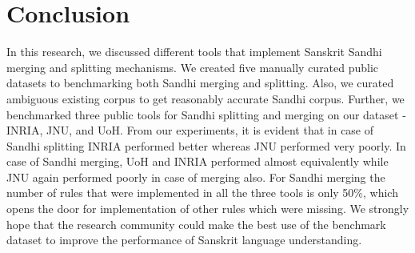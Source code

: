 \documentclass[11pt]{article}
\begin{document}
\section{Conclusion}
In this research, we discussed different tools that implement Sanskrit Sandhi merging and splitting mechanisms. We created five manually curated public datasets to benchmarking both Sandhi merging and splitting. Also, we curated ambiguous existing corpus to get reasonably accurate Sandhi corpus. 
Further, we benchmarked three public tools for Sandhi splitting and merging on our dataset - INRIA, JNU, and UoH. From our experiments, it is evident that in case of Sandhi splitting INRIA performed better whereas JNU performed very poorly. In case of Sandhi merging, UoH and INRIA performed almost equivalently while JNU again performed poorly in case of merging also. 
For Sandhi merging the number of rules that were implemented in all the three tools is only 50\%, which opens the door for implementation of other rules which were missing. We strongly hope that the research community could make the best use of the benchmark dataset to improve the performance of Sanskrit language understanding.

\newpage
{
	
	
}
\end{document}
